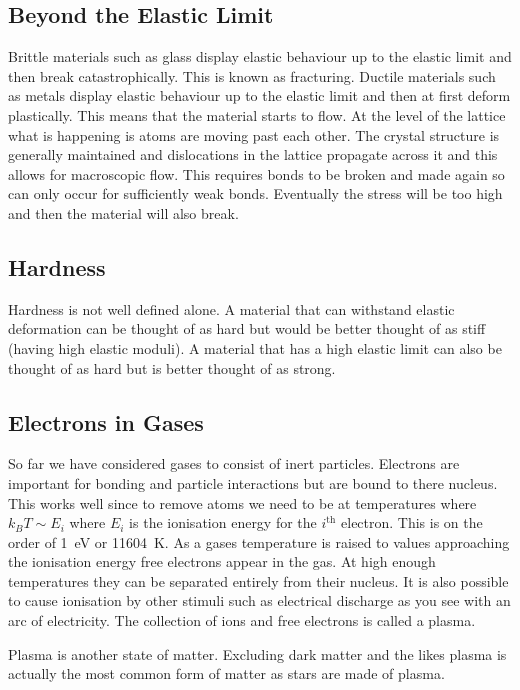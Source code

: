     \subsection{Beyond the Elastic Limit}
    Brittle materials such as glass display elastic behaviour up to the elastic limit and then break catastrophically.
    This is known as fracturing.
    Ductile materials such as metals display elastic behaviour up to the elastic limit and then at first deform plastically.
    This means that the material starts to flow.
    At the level of the lattice what is happening is atoms are moving past each other.
    The crystal structure is generally maintained and dislocations in the lattice propagate across it and this allows for macroscopic flow.
    This requires bonds to be broken and made again so can only occur for sufficiently weak bonds.
    Eventually the stress will be too high and then the material will also break.
    
    \subsection{Hardness}
    Hardness is not well defined alone.
    A material that can withstand elastic deformation can be thought of as hard but would be better thought of as stiff (having high elastic moduli).
    A material that has a high elastic limit can also be thought of as hard but is better thought of as strong.
    
    \subsection{Electrons in Gases}
    So far we have considered gases to consist of inert particles.
    Electrons are important for bonding and particle interactions but are bound to there nucleus.
    This works well since to remove atoms we need to be at temperatures where \(k_BT\sim E_i\) where \(E_i\) is the ionisation energy for the \(i^\text{th}\) electron.
    This is on the order of \SI{1}{eV} or \SI{11604}{K}.
    As a gases temperature is raised to values approaching the ionisation energy free electrons appear in the gas.
    At high enough temperatures they can be separated entirely from their nucleus.
    It is also possible to cause ionisation by other stimuli such as electrical discharge as you see with an arc of electricity.
    The collection of ions and free electrons is called a plasma.
    
    Plasma is another state of matter.
    Excluding dark matter and the likes plasma is actually the most common form of matter as stars are made of plasma.
    
